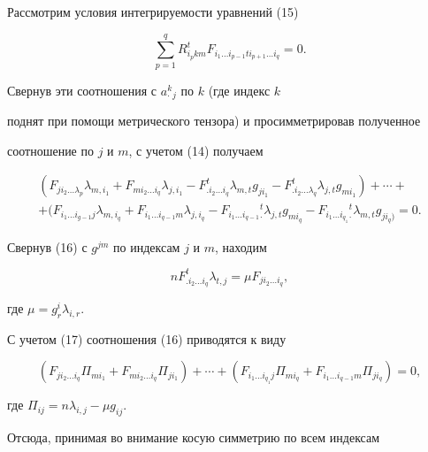Рассмотрим условия интегрируемости уравнений (15)


$$


\sum_{p=1}^q R^t_{i_p km}


F_{i_1\dotsc i_{p-1} t i_{p+1}\dotsc i_q} = 0.


$$


Свернув эти соотношения с $a_{\cdot}^k{}_j$ по $k$ (где индекс $k$


поднят при помощи метрического тензора) и просимметрировав полученное


соотношение по $j$ и $m$, с учетом (14) получаем


\begin{multline}


(F_{ji_2\dotsc\lambda_p}\lambda_{m,i_1} +F_{m i_2\dotsc i_q}


\lambda_{j,i_1} - F_{.i_2\dotsc i_q}^t \lambda_{m,t}g_{ji_1}


- F_{.i_2\dotsc\lambda_q}^t \lambda_{j,t}g_{mi_1})+\dotsb+\\


+(F_{i_1\dotsc i_{g-1}j} \lambda_{m,i_q}+F_{i_1\dotsc i_{q-1}m}


\lambda_{j,i_q} -F_{i_1\dotsc i_{q-1}}{}_.^t


\lambda_{j,t}g_{mi_q} -F_{i_1\dotsc i_{q_1}}{}_.^t


\lambda_{m,t}g_{ji_q)}=0.


\end{multline}


Свернув (16) с $g^{jm}$ по индексам $j$ и $m$, находим


\begin{equation}


n F_{.i_2\dotsc i_q}^t \lambda_{t,j}=\mu F_{ji_2\dotsc i_q},


\end{equation}


где $\mu=g^i_r \lambda_{i,r}$.


С учетом (17) соотношения (16) приводятся к виду


$$


(F_{j{i_2}\dotsc i_q}\Pi_{mi_1}+F_{mi_2\dotsc i_q}\Pi_{ji_1})+\dotsb


+ (F_{i_1\dotsc i_{q_1}j}\Pi_{mi_q}+F_{i_1\dotsc i_{q-1}m}\Pi_{ji_q})=0,


$$


где $\Pi_{ij}=n\lambda_{i,j} - \mu g_{ij}$.


Отсюда, принимая во внимание косую симметрию по всем индексам 


